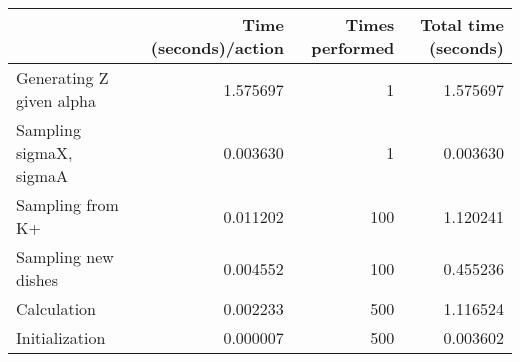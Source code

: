 \begin{tabular}{lrrr}
\toprule
{} &  Time (seconds)/action &  Times performed &  Total time (seconds) \\
\midrule
Generating Z given alpha &               1.575697 &                1 &              1.575697 \\
Sampling sigmaX, sigmaA  &               0.003630 &                1 &              0.003630 \\
Sampling from K+         &               0.011202 &              100 &              1.120241 \\
Sampling new dishes      &               0.004552 &              100 &              0.455236 \\
Calculation              &               0.002233 &              500 &              1.116524 \\
Initialization           &               0.000007 &              500 &              0.003602 \\
\bottomrule
\end{tabular}
